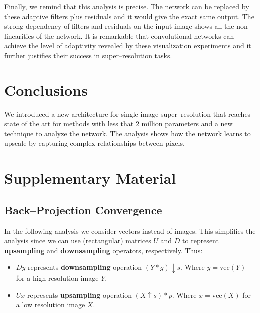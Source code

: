 \documentclass[letterpaper]{article}
\begin{document}
Finally, we remind that this analysis is precise. The network can be replaced by these adaptive filters plus residuals and it would give the exact same output. The strong dependency of filters and residuals on the input image shows all the non--linearities of the network. It is remarkable that convolutional networks can achieve the level of adaptivity revealed by these visualization experiments and it further justifies their success in super--resolution tasks.

\section{Conclusions}
\label{sec:conclusions}
We introduced a new architecture for single image super--resolution that reaches state of the art for methods with less that $2$ million parameters and a new technique to analyze the network. The analysis shows how the network learns to upscale by capturing complex relationships between pixels.




\onecolumn
\section{Supplementary Material}
\label{sec:appendix}
\subsection{Back--Projection Convergence}
\label{ssec:bp_convergence}

In the following analysis we consider vectors instead of images. This simplifies the analysis since we can use (rectangular) matrices $U$ and $D$ to represent \textbf{upsampling} and \textbf{downsampling} operators, respectively. Thus:
\begin{itemize}
    \item $Dy$ represents \textbf{downsampling} operation $(Y*g)\downarrow s$. Where $y=\text{vec}(Y)$ for a high resolution image $Y$.
    \item $Ux$ represents \textbf{upsampling} operation $(X\uparrow s)*p$. Where $x=\text{vec}(X)$ for a low resolution image $X$.
\end{itemize}
\end{document}

